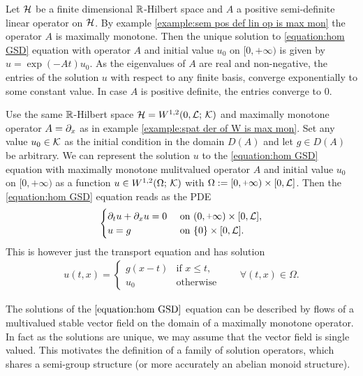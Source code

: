 \begin{example}
	Let $ \mathcal{H} $ be a finite dimensional $ \mathbb{R} $-Hilbert space
	and $ A $ a positive semi-definite linear operator on $ \mathcal{H} $.
	By example \ref{example:sem pos def lin op is max mon} the operator $ A $
	is maximally monotone. Then the unique solution to 
	\ref{equation:hom GSD} equation with operator $ A $ and initial 
	value $ u_0 $ on $ [0,\plus\infty) $ is given by $ u=\exp(-At)u_0 $.
	As the eigenvalues of $ A $ are real and non-negative,
	the entries of the solution $ u $ with respect to any finite
	basis, converge exponentially to some constant value. In case
	$ A $ is positive definite, the entries converge to $ 0 $.
\end{example}

\begin{example}\label{example:hom GSD on l2 with der}
	Use the same $ \mathbb{R} $-Hilbert space $ \mathcal{H}=W^{1,2}(0,\mathcal{L};\,\mathcal{K}) $
	and maximally monotone operator $ A=\partial_x $ as
	in example \ref{example:spat der of W is max mon}.
	Set any value $ u_0\in\mathcal{K} $ as the initial condition
	in the domain $ D(A) $ and let $ g\in D(A) $
	be arbitrary. We can represent the solution
	$ u $ to the \ref{equation:hom GSD} equation with
	maximally monotone mulitvalued operator $ A $
	and initial value $ u_0 $ on $ [0,\plus\infty) $ as a function
	$ u\in W^{1,2}(\Omega;\,\mathcal{K}) $
	with $ \Omega:=[0,\plus\infty)\times [0,\rL] $.
	Then the \ref{equation:hom GSD} equation reads
	as the PDE
	\begin{align*}
		\begin{cases}
			\partial_t u+\partial_x u = 0 & \text{ on }(0,\plus\infty)\times[0,\rL],\\
			u=g & \text{ on }\{0\}\times[0,\rL].
		\end{cases}
	\end{align*}
	This is however just the transport equation and has
	solution 
	\begin{align*}
		u(t,x)=\begin{cases}
			g(x-t) & \text{if }x\leq t,\\
			u_0 & \text{otherwise}
		\end{cases}
		\qquad\forall (t,x)\in\Omega.
	\end{align*}
\end{example}

The solutions of the $ \ref{equation:hom GSD} $ equation
can be described by flows of a multivalued stable vector field
on the domain of a maximally monotone operator. 
In fact as the solutions are unique, we may assume that the vector
field is single valued. This
motivates the definition of a family of solution operators, which
shares a semi-group structure (or more accurately an abelian monoid structure).

